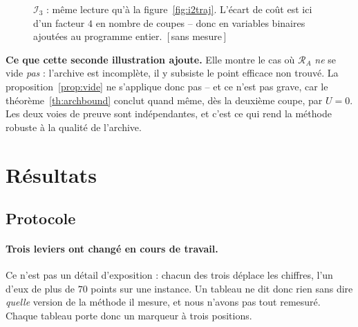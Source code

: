 \documentclass[11pt,a4paper]{article}
\theoremstyle{plain}
\theoremstyle{remark}
\newcommand{\Rcal}{\mathcal{R}}
\newcommand{\qs}{q^{\star}}
\newcommand{\confna}{\textsf{\footnotesize[\,sans mesure\,]}}
\begin{document}
\begin{figure}[H]
\centering
{}
\caption{$\mathcal{I}_3$ : même lecture qu'à la figure~\ref{fig:i2traj}.
L'écart de coût est ici d'un facteur $4$ en nombre de coupes -- donc en
variables binaires ajoutées au programme entier.\ \confna}
\label{fig:i3traj}
\end{figure}

\noindent
\textbf{Ce que cette seconde illustration ajoute.} Elle montre le cas où
$\Rcal_A$ \emph{ne} se vide \emph{pas} : l'archive est incomplète, il y
subsiste le point efficace non trouvé. La proposition~\ref{prop:vide} ne
s'applique donc pas -- et ce n'est pas grave, car le
théorème~\ref{th:archbound} conclut quand même, dès la deuxième coupe, par
$U=0$. Les deux voies de preuve sont indépendantes, et c'est ce qui rend la
méthode robuste à la qualité de l'archive.

\section{Résultats}
\label{sec:res}

\subsection{Protocole}

\paragraph{Trois leviers ont changé en cours de travail.} Ce n'est pas un
détail d'exposition : chacun des trois déplace les chiffres, l'un d'eux de
plus de $70$ points sur une instance. Un tableau ne dit donc rien sans dire
\emph{quelle} version de la méthode il mesure, et nous n'avons pas tout
remesuré. Chaque tableau porte donc un marqueur à trois positions.
\label{sec:marqueur}
\end{document}
